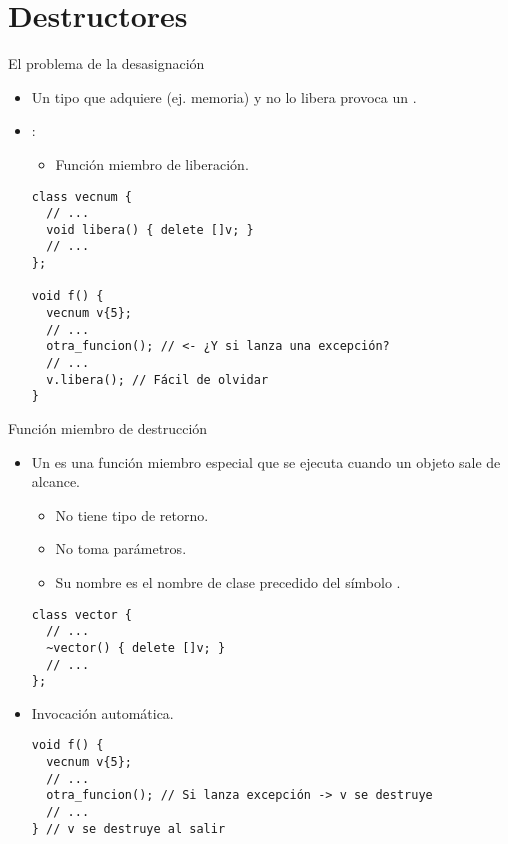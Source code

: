 \section{Destructores}

\begin{frame}[fragile]{El problema de la desasignación}
\begin{itemize}
  \item Un tipo que adquiere  (ej. memoria) 
        y no lo libera provoca un .

  \item {}:
    \begin{itemize}
      \item Función miembro de liberación.
    \end{itemize}
\begin{lstlisting}
class vecnum {
  // ...
  void libera() { delete []v; }
  // ...
};

void f() {
  vecnum v{5};
  // ...
  otra_funcion(); // <- ¿Y si lanza una excepción?
  // ...
  v.libera(); // Fácil de olvidar
}
\end{lstlisting}
\end{itemize}
\end{frame}

\begin{frame}[fragile]{Función miembro de destrucción}
\begin{itemize}
  \item Un  es una función miembro especial que se ejecuta 
         cuando un objeto sale de alcance.
    \begin{itemize}
      \item No tiene tipo de retorno.
      \item No toma parámetros.
      \item Su nombre es el nombre de clase precedido del símbolo \cppkey{\~}.
    \end{itemize}

\begin{lstlisting}
class vector {
  // ...
  ~vector() { delete []v; }
  // ...
};
\end{lstlisting}

  \item Invocación automática.
\begin{lstlisting}
void f() {
  vecnum v{5};
  // ...
  otra_funcion(); // Si lanza excepción -> v se destruye
  // ...
} // v se destruye al salir
\end{lstlisting}
\end{itemize}
\end{frame}

